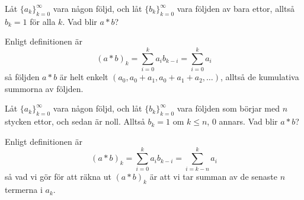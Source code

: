 \documentclass[nobib]{tufte-handout}
\begin{document}
\begin{example}
    Låt $\{a_k\}_{k=0}^\infty$ vara någon följd, och låt $\{b_k\}_{k=0}^\infty$ vara följden av bara ettor, alltså $b_k = 1$ för alla $k$. Vad blir $a*b$?

    Enligt definitionen är
    $$(a*b)_k = \sum_{i=0}^{k} a_i b_{k-i} = \sum_{i=0}^{k} a_i$$
    så följden $a*b$ är helt enkelt $(a_0, a_0 + a_1, a_0 + a_1 + a_2, \ldots)$, alltså de kumulativa summorna av följden.
\end{example}

\begin{example}
    Låt $\{a_k\}_{k=0}^\infty$ vara någon följd, och låt $\{b_k\}_{k=0}^\infty$ vara följden som börjar med $n$ stycken ettor, och sedan är noll. Alltså $b_k = 1$ om $k \leq n$, $0$ annars. Vad blir $a*b$?

    Enligt definitionen är
    $$(a*b)_k = \sum_{i=0}^{k} a_i b_{k-i} = \sum_{i=k-n}^{k} a_i$$
    så vad vi gör för att räkna ut $(a*b)_k$ är att vi tar summan av de senaste $n$ termerna i $a_k$.
\end{example}
\end{document}
